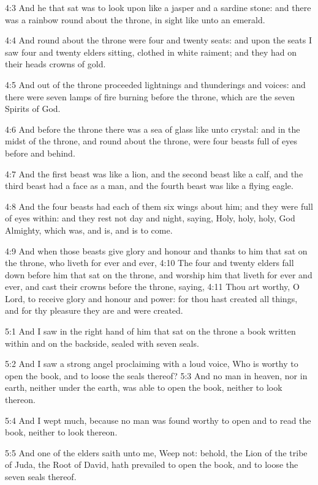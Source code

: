4:3 And he that sat was to look upon like a jasper and a sardine stone: and there was a rainbow round about the throne, in sight like unto an emerald.

4:4 And round about the throne were four and twenty seats: and upon the seats I saw four and twenty elders sitting, clothed in white raiment; and they had on their heads crowns of gold.

4:5 And out of the throne proceeded lightnings and thunderings and voices: and there were seven lamps of fire burning before the throne, which are the seven Spirits of God.

4:6 And before the throne there was a sea of glass like unto crystal: and in the midst of the throne, and round about the throne, were four beasts full of eyes before and behind.

4:7 And the first beast was like a lion, and the second beast like a calf, and the third beast had a face as a man, and the fourth beast was like a flying eagle.

4:8 And the four beasts had each of them six wings about him; and they were full of eyes within: and they rest not day and night, saying, Holy, holy, holy, \LORD God Almighty, which was, and is, and is to come.

4:9 And when those beasts give glory and honour and thanks to him that sat on the throne, who liveth for ever and ever, 4:10 The four and twenty elders fall down before him that sat on the throne, and worship him that liveth for ever and ever, and cast their crowns before the throne, saying, 4:11 Thou art worthy, O Lord, to receive glory and honour and power: for thou hast created all things, and for thy pleasure they are and were created.

5:1 And I saw in the right hand of him that sat on the throne a book written within and on the backside, sealed with seven seals.

5:2 And I saw a strong angel proclaiming with a loud voice, Who is worthy to open the book, and to loose the seals thereof?  5:3 And no man in heaven, nor in earth, neither under the earth, was able to open the book, neither to look thereon.

5:4 And I wept much, because no man was found worthy to open and to read the book, neither to look thereon.

5:5 And one of the elders saith unto me, Weep not: behold, the Lion of the tribe of Juda, the Root of David, hath prevailed to open the book, and to loose the seven seals thereof.

